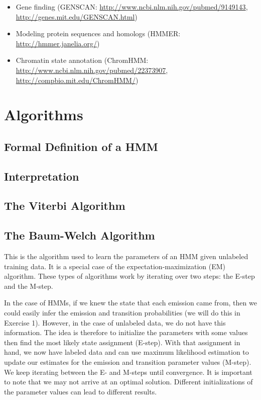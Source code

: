 \documentclass[11pt, oneside]{article}
\begin{document}
\begin{itemize}
\item Gene finding (GENSCAN: \url{http://www.ncbi.nlm.nih.gov/pubmed/9149143}, \url{http://genes.mit.edu/GENSCAN.html})
\item Modeling protein sequences and homologs (HMMER: \url{http://hmmer.janelia.org/})
\item Chromatin state annotation (ChromHMM: \url{http://www.ncbi.nlm.nih.gov/pubmed/22373907}, \url{http://compbio.mit.edu/ChromHMM/})
\end{itemize}

\section{Algorithms}
\subsection{Formal Definition of a HMM}
\subsection{Interpretation}
\subsection{The Viterbi Algorithm}
\subsection{The Baum-Welch Algorithm}

This is the algorithm used to learn the parameters of an HMM given unlabeled training data. 
It is a special case of the expectation-maximization (EM) algorithm. These types of algorithms work by iterating over two steps: the E-step and the M-step.

In the case of HMMs, if we knew the state that each emission came from, then we could easily infer the emission and transition probabilities (we will do this in Exercise 1). However, in the case of unlabeled data, we do not have this information. The idea is therefore to initialize the parameters with some values then find the most likely state assignment (E-step). With that assignment in hand, we now have labeled data and can use maximum likelihood estimation to update our estimates for the emission and transition parameter values (M-step). We keep iterating between the E- and M-steps until convergence. It is important to note that we may not arrive at an optimal solution. Different initializations of the parameter values can lead to different results.
\end{document}

